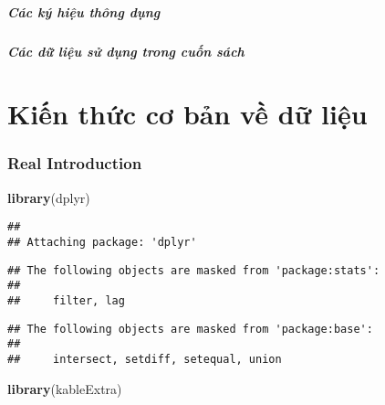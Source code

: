 \documentclass[
]{article}
\newenvironment{Shaded}{\begin{snugshade}}{\end{snugshade}}
\newcommand{\FunctionTok}[1]{\textcolor[rgb]{0.13,0.29,0.53}{\textbf{#1}}}
\newcommand{\NormalTok}[1]{#1}
\begin{document}
\hypertarget{cuxe1c-kuxfd-hiux1ec7u-thuxf4ng-dux1ee5ng}{%
\subsubsection{Các ký hiệu thông dụng}\label{cuxe1c-kuxfd-hiux1ec7u-thuxf4ng-dux1ee5ng}}

\hypertarget{cuxe1c-dux1eef-liux1ec7u-sux1eed-dux1ee5ng-trong-cuux1ed1n-suxe1ch}{%
\subsubsection{Các dữ liệu sử dụng trong cuốn sách}\label{cuxe1c-dux1eef-liux1ec7u-sux1eed-dux1ee5ng-trong-cuux1ed1n-suxe1ch}}

\hypertarget{part-kiux1ebfn-thux1ee9c-cux1a1-bux1ea3n-vux1ec1-dux1eef-liux1ec7u}{%
\part{Kiến thức cơ bản về dữ liệu}\label{part-kiux1ebfn-thux1ee9c-cux1a1-bux1ea3n-vux1ec1-dux1eef-liux1ec7u}}

\hypertarget{real-introduction}{%
\section{Real Introduction}\label{real-introduction}}

\begin{Shaded}
\begin{Highlighting}[]
\FunctionTok{library}\NormalTok{(dplyr)}
\end{Highlighting}
\end{Shaded}

\begin{verbatim}
## 
## Attaching package: 'dplyr'
\end{verbatim}

\begin{verbatim}
## The following objects are masked from 'package:stats':
## 
##     filter, lag
\end{verbatim}

\begin{verbatim}
## The following objects are masked from 'package:base':
## 
##     intersect, setdiff, setequal, union
\end{verbatim}

\begin{Shaded}
\begin{Highlighting}[]
\FunctionTok{library}\NormalTok{(kableExtra)}
\end{Highlighting}
\end{Shaded}
\end{document}
